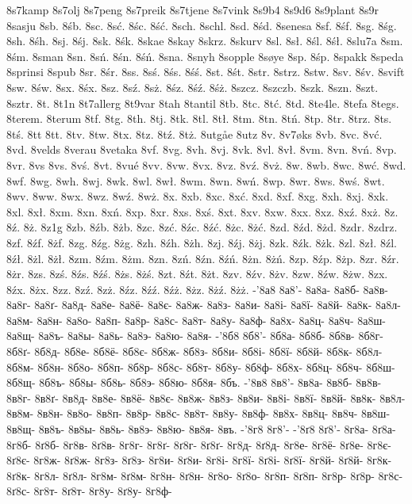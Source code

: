 8s7kamp
8s7olj
8s7peng
8s7preik
8s7tjene
8s7vink
8s9b4
8s9d6
8s9plant
8s9r
8sasju
8sb.
8śb.
8sc.
8sć.
8śc.
8ść.
8sch.
8schl.
8sd.
8śd.
8senesa
8sf.
8śf.
8sg.
8śg.
8sh.
8śh.
8sj.
8śj.
8sk.
8śk.
8skae
8skay
8skrz.
8skurv
8sl.
8sł.
8śl.
8śł.
8slu7a
8sm.
8śm.
8sman
8sn.
8sń.
8śn.
8śń.
8sna.
8snyh
8sopple
8søye
8sp.
8śp.
8spakk
8speda
8sprinsi
8spub
8sr.
8śr.
8ss.
8sś.
8śs.
8śś.
8st.
8śt.
8str.
8strz.
8stw.
8sv.
8śv.
8svift
8sw.
8św.
8sx.
8śx.
8sz.
8sź.
8sż.
8śz.
8śź.
8śż.
8szcz.
8szczb.
8szk.
8szn.
8szt.
8sztr.
8t.
8t1n
8t7allerg
8t9var
8tah
8tantil
8tb.
8tc.
8tć.
8td.
8te4le.
8tefa
8tegs.
8terem.
8terum
8tf.
8tg.
8th.
8tj.
8tk.
8tl.
8tł.
8tm.
8tn.
8tń.
8tp.
8tr.
8trz.
8ts.
8tś.
8tt
8tt.
8tv.
8tw.
8tx.
8tz.
8tź.
8tż.
8utgåe
8utz
8v.
8v7øks
8vb.
8vc.
8vć.
8vd.
8velds
8verau
8vetaka
8vf.
8vg.
8vh.
8vj.
8vk.
8vl.
8vł.
8vm.
8vn.
8vń.
8vp.
8vr.
8vs
8vs.
8vś.
8vt.
8vué
8vv.
8vw.
8vx.
8vz.
8vź.
8vż.
8w.
8wb.
8wc.
8wć.
8wd.
8wf.
8wg.
8wh.
8wj.
8wk.
8wl.
8wł.
8wm.
8wn.
8wń.
8wp.
8wr.
8ws.
8wś.
8wt.
8wv.
8ww.
8wx.
8wz.
8wź.
8wż.
8x.
8xb.
8xc.
8xć.
8xd.
8xf.
8xg.
8xh.
8xj.
8xk.
8xl.
8xł.
8xm.
8xn.
8xń.
8xp.
8xr.
8xs.
8xś.
8xt.
8xv.
8xw.
8xx.
8xz.
8xź.
8xż.
8z.
8ź.
8ż.
8z1g
8zb.
8źb.
8żb.
8zc.
8zć.
8źc.
8źć.
8żc.
8żć.
8zd.
8źd.
8żd.
8zdr.
8zdrz.
8zf.
8źf.
8żf.
8zg.
8źg.
8żg.
8zh.
8źh.
8żh.
8zj.
8źj.
8żj.
8zk.
8źk.
8żk.
8zl.
8zł.
8źl.
8źł.
8żl.
8żł.
8zm.
8źm.
8żm.
8zn.
8zń.
8źn.
8źń.
8żn.
8żń.
8zp.
8źp.
8żp.
8zr.
8źr.
8żr.
8zs.
8zś.
8źs.
8źś.
8żs.
8żś.
8zt.
8źt.
8żt.
8zv.
8źv.
8żv.
8zw.
8źw.
8żw.
8zx.
8źx.
8żx.
8zz.
8zź.
8zż.
8źz.
8źź.
8źż.
8żz.
8żź.
8żż.
-'8а8
8а8'-
8а8а-
8а8б-
8а8в-
8а8г-
8а8ґ-
8а8д-
8а8е-
8а8ё-
8а8є-
8а8ж-
8а8з-
8а8и-
8а8і-
8а8ї-
8а8й-
8а8к-
8а8л-
8а8м-
8а8н-
8а8о-
8а8п-
8а8р-
8а8с-
8а8т-
8а8у-
8а8ф-
8а8х-
8а8ц-
8а8ч-
8а8ш-
8а8щ-
8а8ъ-
8а8ы-
8а8ь-
8а8э-
8а8ю-
8а8я-
-'8б8
8б8'-
8б8а-
8б8б-
8б8в-
8б8г-
8б8ґ-
8б8д-
8б8е-
8б8ё-
8б8є-
8б8ж-
8б8з-
8б8и-
8б8і-
8б8ї-
8б8й-
8б8к-
8б8л-
8б8м-
8б8н-
8б8о-
8б8п-
8б8р-
8б8с-
8б8т-
8б8у-
8б8ф-
8б8х-
8б8ц-
8б8ч-
8б8ш-
8б8щ-
8б8ъ-
8б8ы-
8б8ь-
8б8э-
8б8ю-
8б8я-
8бъ.
-'8в8
8в8'-
8в8а-
8в8б-
8в8в-
8в8г-
8в8ґ-
8в8д-
8в8е-
8в8ё-
8в8є-
8в8ж-
8в8з-
8в8и-
8в8і-
8в8ї-
8в8й-
8в8к-
8в8л-
8в8м-
8в8н-
8в8о-
8в8п-
8в8р-
8в8с-
8в8т-
8в8у-
8в8ф-
8в8х-
8в8ц-
8в8ч-
8в8ш-
8в8щ-
8в8ъ-
8в8ы-
8в8ь-
8в8э-
8в8ю-
8в8я-
8въ.
-'8г8
8г8'-
-'8ґ8
8ґ8'-
8г8а-
8ґ8а-
8г8б-
8ґ8б-
8г8в-
8ґ8в-
8г8г-
8г8ґ-
8ґ8г-
8ґ8ґ-
8г8д-
8ґ8д-
8г8е-
8г8ё-
8ґ8е-
8г8є-
8ґ8є-
8г8ж-
8ґ8ж-
8г8з-
8ґ8з-
8г8и-
8ґ8и-
8г8і-
8г8ї-
8ґ8і-
8ґ8ї-
8г8й-
8ґ8й-
8г8к-
8ґ8к-
8г8л-
8ґ8л-
8г8м-
8ґ8м-
8г8н-
8ґ8н-
8г8о-
8ґ8о-
8г8п-
8ґ8п-
8г8р-
8ґ8р-
8г8с-
8ґ8с-
8г8т-
8ґ8т-
8г8у-
8ґ8у-
8г8ф-
